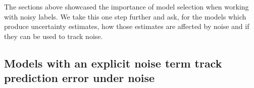 The sections above showcased the importance of model selection when working with noisy labels. We take this one step further and ask, for the models which produce uncertainty estimates, how those estimates are affected by noise and if they can be used to track noise. 

\subsection{Models with an explicit noise term track prediction error under noise}
